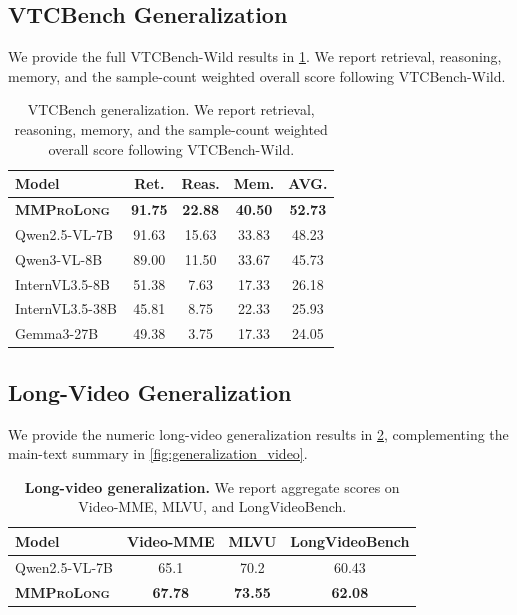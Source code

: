\documentclass{llmxive}
\providecommand{\modelname}{\textsc{\textbf{MMProLong}}\xspace}
\begin{document}
{{{{{\subsection{VTCBench Generalization}
\label{app:complementary_experiment_results:generalization_vtc}
We provide the full VTCBench-Wild results in \cref{tab:generalization_vtc}. We report retrieval, reasoning, memory, and the sample-count weighted overall score following VTCBench-Wild.

\begin{table}[!htbp]
 \centering
 \scriptsize
 \begin{tabular*}{0.7\linewidth}{@{\extracolsep{\fill}}lcccc@{}}
 \toprule
 \textbf{Model} & Ret. & Reas. & Mem. & AVG. \\
 \midrule
 \modelname & \textbf{91.75} & \textbf{22.88} & \textbf{40.50} & \textbf{52.73} \\
 Qwen2.5-VL-7B & 91.63 & 15.63 & 33.83 & 48.23 \\
 \midrule
 Qwen3-VL-8B & 89.00 & 11.50 & 33.67 & 45.73 \\
 InternVL3.5-8B & 51.38 & 7.63 & 17.33 & 26.18 \\
 InternVL3.5-38B & 45.81 & 8.75 & 22.33 & 25.93 \\
 Gemma3-27B & 49.38 & 3.75 & 17.33 & 24.05 \\
 \bottomrule
 \end{tabular*}
\caption{VTCBench generalization. We report retrieval, reasoning, memory, and the sample-count weighted overall score following VTCBench-Wild.}
\label{tab:generalization_vtc}
\end{table}

\subsection{Long-Video Generalization}
\label{app:complementary_experiment_results:generalization_video}
We provide the numeric long-video generalization results in \cref{tab:generalization_video}, complementing the main-text summary in \cref{fig:generalization_video}.

\begin{table}[!htbp]
\centering
\scriptsize
\begin{tabular*}{0.7\linewidth}{@{\extracolsep{\fill}}lccc@{}}
\toprule
\textbf{Model} & Video-MME & MLVU & LongVideoBench \\
\midrule
Qwen2.5-VL-7B & 65.1 & 70.2 & 60.43 \\
\modelname & \textbf{67.78} & \textbf{73.55} & \textbf{62.08} \\
\bottomrule
\end{tabular*}
\caption{\textbf{Long-video generalization.} We report aggregate scores on Video-MME, MLVU, and LongVideoBench.}
\label{tab:generalization_video}
\end{table}

}}}}}
\end{document}
